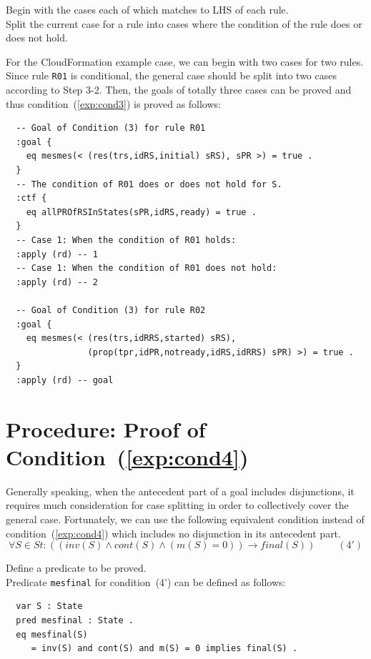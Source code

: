\documentclass[12pt]{report}
\newcommand{\ra}{\rightarrow}
\begin{document}
\vspace{0.3cm}
 Begin with the cases each of which matches to
LHS of each rule. \\ 
 Split the current case for a rule into
cases where the condition of the rule does or does not hold. 

For the CloudFormation example case, we can begin with two cases for
two rules. Since rule {\tt R01} is conditional, the general case
should be split into two cases according to Step 3-2. Then, the goals
of totally three cases can be proved and thus
condition~(\ref{exp:cond3}) is proved as follows:
\small
\begin{verbatim}
  -- Goal of Condition (3) for rule R01
  :goal {
    eq mesmes(< (res(trs,idRS,initial) sRS), sPR >) = true .
  }
  -- The condition of R01 does or does not hold for S.
  :ctf {
    eq allPROfRSInStates(sPR,idRS,ready) = true .
  }
  -- Case 1: When the condition of R01 holds:
  :apply (rd) -- 1
  -- Case 1: When the condition of R01 does not hold:
  :apply (rd) -- 2

  -- Goal of Condition (3) for rule R02
  :goal {
    eq mesmes(< (res(trs,idRRS,started) sRS),
                (prop(tpr,idPR,notready,idRS,idRRS) sPR) >) = true .
  }
  :apply (rd) -- goal

\end{verbatim}
\normalsize

\section{Procedure: Proof of Condition~(\ref{exp:cond4})}
\label{sec:mesfinal}
Generally speaking, when the antecedent part of a goal includes
disjunctions, it requires much consideration for case splitting in
order to collectively cover the general case. Fortunately, we can use
the following equivalent condition instead of
condition~(\ref{exp:cond4}) which includes no disjunction in its
antecedent part.
\[\forall S\in St:((inv(S)\land cont(S)\land(m(S) = 0))
  \ra final(S))~~~~~~~~~~(4')\]

\vspace{0.3cm}
 Define a predicate to be proved. \\ Predicate
         {\tt mesfinal} for condition~(4') can be defined as follows:
\small
\begin{verbatim}
  var S : State
  pred mesfinal : State .
  eq mesfinal(S)
     = inv(S) and cont(S) and m(S) = 0 implies final(S) .
\end{verbatim}
\normalsize
\end{document}
